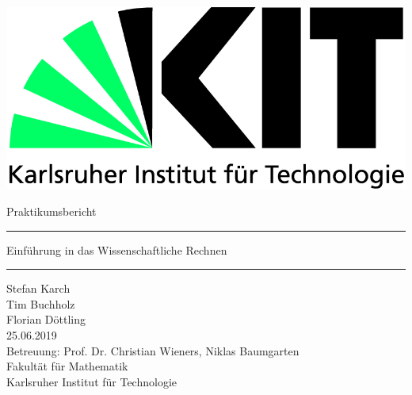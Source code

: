 \begin{titlepage}
	\includegraphics[scale=0.5]{kit-logo.jpg} 
	\begin{center} 
		\LARGE 
		\vspace*{2cm}
		\LARGE Praktikumsbericht \BerichtNR
		\vspace*{1.0cm}
		\hrule
		\vspace*{0.2cm}
		{\vspace{0.2cm} \huge Einführung in das Wissenschaftliche Rechnen}\vspace{0.5cm}
		\hrule
		\vspace*{2.5cm}
		\Large Stefan Karch \\
		Tim Buchholz  \\
		Florian Döttling \\
		\vspace*{1cm}
		25.06.2019 \\
		\vspace*{1.5cm}
		\vspace*{4.0cm}
		\Large Betreuung: Prof. Dr. Christian Wieners, Niklas Baumgarten \\[0.5cm]
		\Large Fakultät für Mathematik \\
		\Large Karlsruher Institut für Technologie
	\end{center}
\end{titlepage}